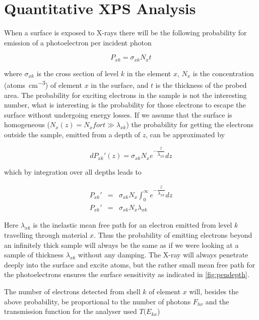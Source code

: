 \section{Quantitative XPS Analysis}
When a surface is exposed to X-rays there  will be the following probability for emission of a photoelectron per incident photon

\begin{equation}
P_{xk}=\sigma_{xk}N_xt
\end{equation}

\noindent where $\sigma_{xk}$ is the cross section of level $k$ in the element $x$, $N_x$ is the concentration (\si{atoms\per cm^3})  of element $x$ in the surface, and $t$ is  the thickness of the probed area. The probability for exciting electrons in the sample is not the interesting number, what is interesting is the probability for those electrons to escape the surface without undergoing energy losses. If we assume that the surface is homogeneous ($N_{x}(z) = N_{x} for t\gg \lambda_{xk}$) the probability for getting the electrons outside the sample, emitted from a depth of $z$, can be approximated by

\begin{equation}
dP_{xk}\prime(z)=\sigma_{xk}N_xe^{-\dfrac{z}{\lambda_{xk}}}dz
\end{equation}

\noindent which by integration over all depths leads to

\begin{eqnarray}
P_{xk}\prime	& =	& \sigma_{xk}N_x\int_0^{\infty}
          e^{-\dfrac{z}{\lambda_{xk}}}dz\\
P_{xk}\prime	& =	& \sigma_{xk}N_x\lambda_{xk}
\end{eqnarray}

Here $\lambda_{xk}$ is the inelastic mean free path for an electron emitted from level $k$ travelling through material $x$. Thus the probability of emitting electrons beyond an infinitely thick sample will always be the same as if we were looking at a sample of thickness $\lambda_{xk}$ without any damping. The X-ray will always penetrate deeply into the surface and excite atoms, but the rather small mean free path for the photoelectrons ensures the surface sensitivity as indicated in \autoref{fig:pendepth}.

The number of electrons detected from  shell $k$ of element $x$ will, besides the above probability, be proportional to  the number of photons $F_{h\nu}$ and the  transmission function for the analyser used $T(E_{kx}$)

